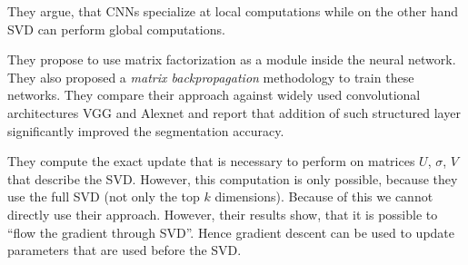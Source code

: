     They argue, that CNNs specialize at local computations while on the other hand SVD can perform global computations.
    
    They propose to use matrix factorization as a module inside the neural network.
    They also proposed a \emph{matrix backpropagation} methodology to train these networks.
    They compare their approach against widely used convolutional architectures VGG and Alexnet and report that addition of such structured layer significantly improved the segmentation accuracy.
    
    They compute the exact update that is necessary to perform on matrices $U$, $\sigma$, $V$ that describe the SVD.
    However, this computation is only possible, because they use the full SVD (not only the top $k$ dimensions).
    Because of this we cannot directly use their approach.
    However, their results show, that it is possible to ``flow the gradient through SVD''.
    Hence gradient descent can be used to update parameters that are used before the SVD.
    
    